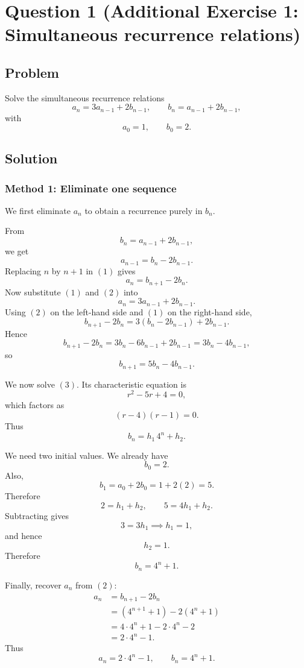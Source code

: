 \documentclass[12pt]{article}
\begin{document}
\section{Question 1 (Additional Exercise 1: Simultaneous recurrence relations)}

\subsection{Problem}
Solve the simultaneous recurrence relations
\[
a_n=3a_{n-1}+2b_{n-1},\qquad
b_n=a_{n-1}+2b_{n-1},
\]
with
\[
a_0=1,\qquad b_0=2.
\]

\subsection{Solution}

\subsubsection{Method 1: Eliminate one sequence}
We first eliminate \(a_n\) to obtain a recurrence purely in \(b_n\).

From
\[
b_n=a_{n-1}+2b_{n-1},
\]
we get
\[
a_{n-1}=b_n-2b_{n-1}. \tag{1}
\]
Replacing \(n\) by \(n+1\) in \((1)\) gives
\[
a_n=b_{n+1}-2b_n. \tag{2}
\]
Now substitute \((1)\) and \((2)\) into
\[
a_n=3a_{n-1}+2b_{n-1}.
\]
Using \((2)\) on the left-hand side and \((1)\) on the right-hand side,
\[
b_{n+1}-2b_n=3(b_n-2b_{n-1})+2b_{n-1}.
\]
Hence
\[
b_{n+1}-2b_n=3b_n-6b_{n-1}+2b_{n-1}=3b_n-4b_{n-1},
\]
so
\[
b_{n+1}=5b_n-4b_{n-1}. \tag{3}
\]

We now solve \((3)\). Its characteristic equation is
\[
r^2-5r+4=0,
\]
which factors as
\[
(r-4)(r-1)=0.
\]
Thus
\[
b_n=h_1\,4^n+h_2.
\]

We need two initial values. We already have
\[
b_0=2.
\]
Also,
\[
b_1=a_0+2b_0=1+2(2)=5.
\]
Therefore
\[
2=h_1+h_2,\qquad 5=4h_1+h_2.
\]
Subtracting gives
\[
3=3h_1 \implies h_1=1,
\]
and hence
\[
h_2=1.
\]
Therefore
\[
b_n=4^n+1.
\]

Finally, recover \(a_n\) from \((2)\):
\begin{align*}
a_n&=b_{n+1}-2b_n\\
&=(4^{n+1}+1)-2(4^n+1)\\
&=4\cdot 4^n+1-2\cdot 4^n-2\\
&=2\cdot 4^n-1.
\end{align*}
Thus
\[
\boxed{a_n=2\cdot 4^n-1,\qquad b_n=4^n+1.}
\]
\end{document}
